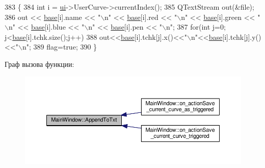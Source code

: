 \begin{DoxyCode}
383 \{
384     \textcolor{keywordtype}{int} i = \hyperlink{class_main_window_a35466a70ed47252a0191168126a352a5}{ui}->UserCurve->currentIndex();
385     QTextStream out(&file);
386     out << \hyperlink{class_main_window_a3413d4508f4981518b1b8ebf3b29121e}{base}[i].name << \textcolor{stringliteral}{"\(\backslash\)n"} << \hyperlink{class_main_window_a3413d4508f4981518b1b8ebf3b29121e}{base}[i].red << \textcolor{stringliteral}{"\(\backslash\)n"} << \hyperlink{class_main_window_a3413d4508f4981518b1b8ebf3b29121e}{base}[i].green << \textcolor{stringliteral}{"\(\backslash\)n"} << 
      \hyperlink{class_main_window_a3413d4508f4981518b1b8ebf3b29121e}{base}[i].blue << \textcolor{stringliteral}{"\(\backslash\)n"} << \hyperlink{class_main_window_a3413d4508f4981518b1b8ebf3b29121e}{base}[i].pen << \textcolor{stringliteral}{"\(\backslash\)n"};
387     \textcolor{keywordflow}{for}(\textcolor{keywordtype}{int} j=0; j<\hyperlink{class_main_window_a3413d4508f4981518b1b8ebf3b29121e}{base}[i].tchk.size();j++)
388         out<<\hyperlink{class_main_window_a3413d4508f4981518b1b8ebf3b29121e}{base}[i].tchk[j].x()<<\textcolor{stringliteral}{"\(\backslash\)n"}<<\hyperlink{class_main_window_a3413d4508f4981518b1b8ebf3b29121e}{base}[i].tchk[j].y()<<\textcolor{stringliteral}{"\(\backslash\)n"};
389     flag=\textcolor{keyword}{true};
390 \}
\end{DoxyCode}


Граф вызова функции\+:\nopagebreak
\begin{figure}[H]
\begin{center}
\leavevmode
\includegraphics[width=350pt]{class_main_window_ada72ba7c0365cd69528339a0298941d2_icgraph}
\end{center}
\end{figure}


